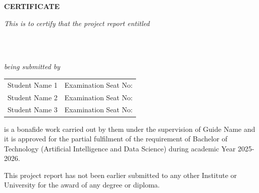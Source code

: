 
\begin{center}

\vspace*{3\baselineskip} 
{\Large \bf{CERTIFICATE}} \\

\end{center}

\vspace{0.4cm}
\centerline{\textit{This is to certify that the project report entitled}}
\vspace*{0.6\baselineskip} 
{\bfseries \fontsize{16}{12} \centering\selectfont{Project Name}  \\}
\vspace*{0.3\baselineskip} 
{\bfseries \fontsize{14}{12} \centering\selectfont{Short Description}  \\}
\vspace*{0.6\baselineskip} 

\centerline{\textit{being submitted by}} 
\vspace*{0.5\baselineskip} 

{\large \begin{center}
\begin{tabular}{l l}
Student Name 1        & Examination Seat No:  \\
Student Name 2            & Examination Seat No:  \\
Student Name 3        & Examination Seat No:  \\
\end{tabular}
\end{center}}

\vspace*{1.5\baselineskip} 
\noindent is a bonafide work carried out by them under the supervision of Guide Name and it is approved for the partial fulfilment of the requirement of Bachelor of Technology (Artificial Intelligence and Data Science) during academic Year 2025-2026.

\vspace*{0.8\baselineskip} 
\noindent This project report has not been earlier submitted to any other Institute or University for the award of any degree or diploma.

\vspace*{3.5\baselineskip} 

